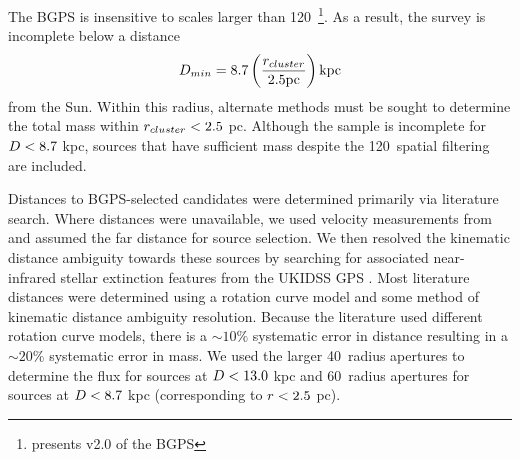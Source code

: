 
The BGPS is insensitive to scales larger than 120\arcsec\
\citep[][]{Ginsburg2012}\footnote{\citet{Ginsburg2012} presents v2.0 of the
BGPS}.  As a result, the survey is incomplete below a distance $$D_{min} =
8.7 \left(\frac{r_{cluster}}{2.5 \textrm{pc}}\right) \textrm{kpc} $$ from
the Sun.  Within this radius, alternate methods must be sought to determine the
total mass within $r_{cluster} < 2.5$ pc.  Although the sample is
incomplete for $D < 8.7$ kpc, sources that have sufficient mass despite
the 120\arcsec\ spatial filtering are included.


Distances to BGPS-selected candidates were determined primarily via literature
search.  Where distances were unavailable, we used velocity measurements from
\citet{Schlingman2011} and assumed the far distance for source selection.  We
then resolved the kinematic distance ambiguity towards these sources by
searching for associated near-infrared stellar extinction features from the
UKIDSS GPS \citep{Lucas2008}.
Most literature distances were determined using a
rotation curve model and some method of kinematic distance ambiguity
resolution. Because the literature used different rotation curve models, there
is a $\sim10\%$ systematic error in distance resulting in a $\sim20\%$
systematic error in mass. We used the larger
40\arcsec\ radius apertures to determine the flux for sources at
$D<13.0$ kpc and 60\arcsec\ radius apertures for sources at $D<8.7$
kpc (corresponding to $r<2.5$ pc).




